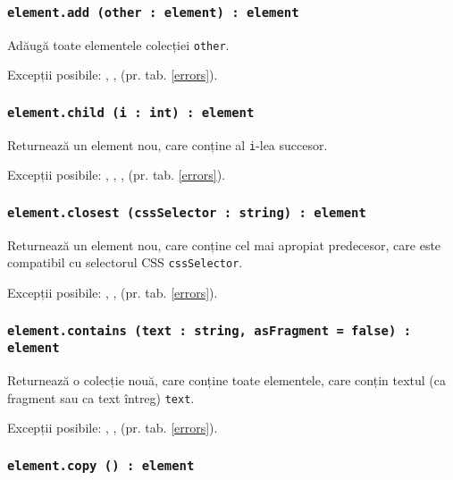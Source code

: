 \subsubsection{\texttt{element.add (other : element) : element}}

Adăugă toate elementele colecției \texttt{other}.

Excepții posibile: , ,  (pr. tab. \ref{errors}).

\subsubsection{\texttt{element.child (i : int) : element}}

Returnează un element nou, care conține al \texttt{i}-lea succesor.

Excepții posibile: , , ,  (pr. tab. \ref{errors}).

\subsubsection{\texttt{element.closest (cssSelector : string) : element}}

Returnează un element nou, care conține cel mai apropiat predecesor, care este compatibil cu selectorul CSS \texttt{cssSelector}.

Excepții posibile: , ,  (pr. tab. \ref{errors}).

\subsubsection{\texttt{element.contains (text : string, asFragment = false) : element}}

Returnează o colecție nouă, care conține toate elementele, care conțin textul (ca fragment sau ca text întreg) \texttt{text}.

Excepții posibile: , ,  (pr. tab. \ref{errors}).

\subsubsection{\texttt{element.copy () : element}}

